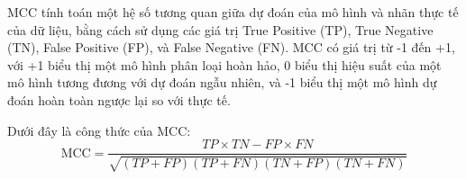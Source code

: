 MCC tính toán một hệ số tương quan giữa dự đoán của mô hình và nhãn thực tế của dữ liệu, bằng cách sử dụng các giá trị True Positive (TP), True Negative (TN), False Positive (FP), và False Negative (FN). MCC có giá trị từ -1 đến +1, với +1 biểu thị một mô hình phân loại hoàn hảo, 0 biểu thị hiệu suất của một mô hình tương đương với dự đoán ngẫu nhiên, và -1 biểu thị một mô hình dự đoán hoàn toàn ngược lại so với thực tế.

Dưới đây là công thức của MCC:
$$\text{MCC} = \frac{TP \times TN - FP \times FN}{\sqrt{(TP + FP)(TP + FN)(TN + FP)(TN + FN)}}$$





